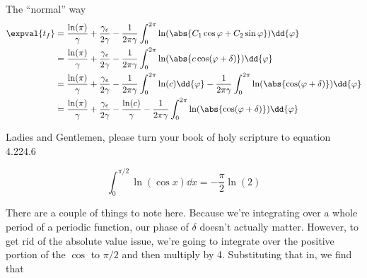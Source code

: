 \begin{answer}
\begin{answerpart}{The ``normal'' way}
    \begin{equation}
      \begin{split}
        \expval{t_f}
        &=
        \frac{\ln(\pi)}{\gamma}
        +
        \frac{\gamma_e}{2\gamma}
        -
        \frac{1}{2\pi\gamma}
        \int_{0}^{2\pi}
        \ln(\abs{C_1\cos{\varphi} + C_2\sin{\varphi}})
        \dd{\varphi}
        \\
        &=
        \frac{\ln(\pi)}{\gamma}
        +
        \frac{\gamma_e}{2\gamma}
        -
        \frac{1}{2\pi\gamma}
        \int_{0}^{2\pi}
        \ln(\abs{c\cos(\varphi + \delta)})
        \dd{\varphi}
        \\
        &=
        \frac{\ln(\pi)}{\gamma}
        +
        \frac{\gamma_e}{2\gamma}
        -
        \frac{1}{2\pi\gamma}
        \int_{0}^{2\pi}
        \ln(c)
        \dd{\varphi}
        -
        \frac{1}{2\pi\gamma}
        \int_{0}^{2\pi}
        \ln(\abs{\cos(\varphi + \delta)})
        \dd{\varphi}
        \\
        &=
        \frac{\ln(\pi)}{\gamma}
        +
        \frac{\gamma_e}{2\gamma}
        -
        \frac{\ln(c)}{\gamma}
        -
        \frac{1}{2\pi\gamma}
        \int_{0}^{2\pi}
        \ln(\abs{\cos(\varphi + \delta)})
        \dd{\varphi}
        \\
      \end{split}
    \end{equation}

    Ladies and Gentlemen, please turn your book of holy scripture to
    equation 4.224.6

    \begin{equation}
      \tag{4.224.6}
      \int_{0}^{\pi/2} \ln(\cos x)\dd{x} = -\frac{\pi}{2}\ln(2)
    \end{equation}\cite[eq4.224.6]{gr}

    There are a couple of things to note here.  Because we're
    integrating over a whole period of a periodic function, our phase
    of $\delta$ doesn't actually matter.  However, to get rid of the
    absolute value issue, we're going to integrate over the positive
    portion of the $\cos$ to $\pi/2$ and then multiply by 4.
    Substituting that in, we find that


\end{answerpart}
\end{answer}

